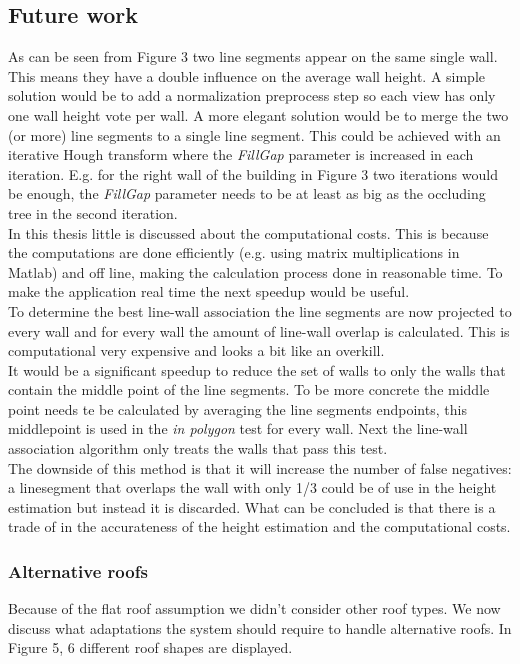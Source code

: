 \documentclass[10pt]{article}
\begin{document}
{\subsection{Future work}
As can be seen from Figure 3
two line segments appear on the same single wall. This means they have a double
influence on the average wall height. 
A simple solution would be to add a normalization preprocess step so each view
has only one wall height vote per wall. A more elegant solution would be to
merge the two (or more) line segments to a single line segment. This could be
achieved with an iterative Hough transform where the \emph{FillGap} parameter is
increased in each iteration. E.g. for the right wall of the building in Figure 3  %
two iterations would be enough, the \emph{FillGap} parameter needs to be at least as big as the occluding tree in the second iteration.\\

In this thesis little is discussed about the computational costs. This is
because the computations are done efficiently (e.g. using matrix multiplications
in Matlab) and off line, making the calculation process done in reasonable time.
To make the application real time the next speedup would be useful.\\
To determine the best line-wall association the line segments are now projected to
every wall and for every wall the amount of line-wall overlap is calculated. This
is computational very expensive and looks a bit like an overkill.\\
It would be a significant speedup to reduce the set of walls to only the walls
that contain the middle point of the line segments. To be more concrete the
middle point needs te be calculated by averaging the line segments endpoints,
this middlepoint is used in the \emph{in polygon} test for every wall.  Next the
line-wall association algorithm only treats the walls that pass this test.\\
The downside of this method is that it will increase the number of false
negatives: a linesegment that overlaps the wall with only 1/3 could be of
use in the height estimation but instead it is discarded.
What can be concluded is that there is a trade of in the accurateness of the
height estimation and the computational costs.


\subsubsection{Alternative roofs}
Because of the flat roof assumption we didn't consider other roof types.
We now discuss what adaptations the system should require to handle alternative roofs.
In Figure 5, 6 different roof shapes are displayed.\\

}
\end{document}
